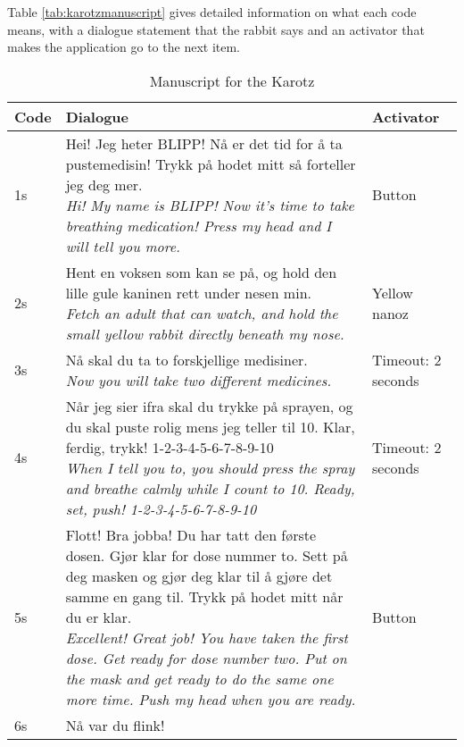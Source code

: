 Table \ref{tab:karotzmanuscript} gives detailed information on what each code means, with a dialogue statement that the rabbit says and an activator that makes 
the application go to the next item.

	\begin{center}
		\begin{longtable}{|p{1.2cm}|p{13.5cm}|p{2cm}|}
			\endfirsthead
			\endhead
			\endfoot
			\caption{Manuscript for the Karotz}
			\endlastfoot
			\hline
			\bfseries{Code} & \bfseries{Dialogue} & \bfseries{Activator} \\
			\hline
			1s & \specialcell{13.5cm}{Hei! Jeg heter BLIPP! N{\aa} er det tid for {\aa} ta pustemedisin! Trykk p{\aa} hodet mitt s{\aa} forteller jeg deg mer.\\
							 	\emph{Hi! My name is BLIPP! Now it's time to take breathing medication! Press my head and I will tell you more.}} & Button \\
			\hline
			2s & \specialcell{13.5cm}{Hent en voksen som kan se p{\aa}, og hold den lille gule kaninen rett under nesen min. \\
								\emph{Fetch an adult that can watch, and hold the small yellow rabbit directly beneath my nose.}} & Yellow nanoz\\
			\hline
			3s & \specialcell{13.5cm}{N{\aa} skal du ta to forskjellige medisiner. \\
								\emph{Now you will take two different medicines.}} & Timeout: 2 seconds \\
			\hline
			4s & \specialcell{13.5cm}{N{\aa}r jeg sier ifra skal du trykke p{\aa} sprayen, og du skal puste rolig mens jeg teller til 10. Klar, ferdig, trykk! 1-2-3-4-5-6-7-8-9-10 \\
								\emph{When I tell you to, you should press the spray and breathe calmly while I count to 10. Ready, set, push! 1-2-3-4-5-6-7-8-9-10}} & Timeout: 2 seconds \\
			\hline
			5s & \specialcell{13.5cm}{Flott! Bra jobba! Du har tatt den f{\o}rste dosen. Gj{\o}r klar for dose nummer to. Sett p{\aa} deg masken og gj{\o}r deg klar til {\aa} gj{\o}re det samme en gang til. Trykk p{\aa} hodet mitt n{\aa}r du er klar. \\
								\emph{Excellent! Great job! You have taken the first dose. Get ready for dose number two. Put on the mask and get ready to do the same one more time. Push my head when you are ready.}} & Button \\
			\hline
			6s & \specialcell{13.5cm}{N{\aa} var du flink! \\
}
\end{longtable}
\end{center}

